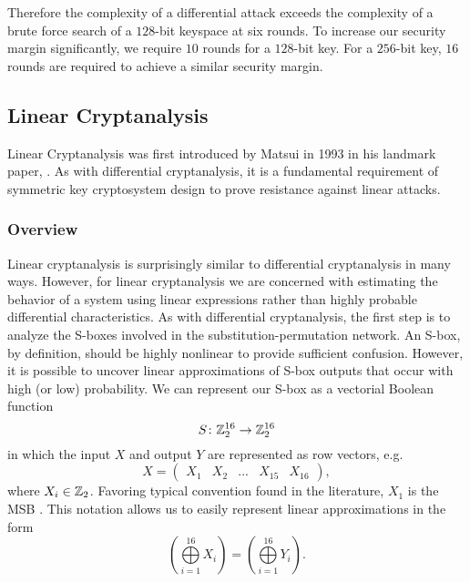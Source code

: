 Therefore the complexity of a differential attack exceeds the complexity of a brute force search of a $128$-bit keyspace at six rounds.
To increase our security margin significantly, we require $10$ rounds for a $128$-bit key.
For a $256$-bit key, $16$ rounds are required to achieve a similar security margin.

\subsection{Linear Cryptanalysis}
Linear Cryptanalysis was first introduced by Matsui in 1993 in his landmark paper, \cite{Matsui1993_Linear}.
As with differential cryptanalysis, it is a fundamental requirement of symmetric key cryptosystem design to prove resistance against linear attacks.

\subsubsection{Overview}
Linear cryptanalysis is surprisingly similar to differential cryptanalysis in many ways. 
However, for linear cryptanalysis we are concerned with estimating the behavior of a system using linear expressions rather than highly probable differential characteristics.
As with differential cryptanalysis, the first step is to analyze the S-boxes involved in the substitution-permutation network.
An S-box, by definition, should be highly nonlinear to provide sufficient confusion. 
However, it is possible to uncover linear approximations of S-box outputs that occur with high (or low) probability.
We can represent our S-box as a vectorial Boolean function 
\begin{equation*}
S \colon \mathbb{Z}_2^{16} \rightarrow \mathbb{Z}_2^{16}
\end{equation*}
in which the input $X$ and output $Y$ are represented as row vectors, e.g.\
\begin{equation*}
X = \begin{pmatrix}X_1 & X_2 & ... & X_{15} & X_{16} \end{pmatrix},
\end{equation*}
where $X_i \in \mathbb{Z}_2$.
Favoring typical convention found in the literature, $X_1$ is the MSB \cite{Heys2002_Tutorial}.
This notation allows us to easily represent linear approximations in the form
\begin{equation*}
\left( \bigoplus\limits_{i=1}^{16} X_i \right) = \left( \bigoplus\limits_{i=1}^{16} Y_i \right).
\end{equation*}

